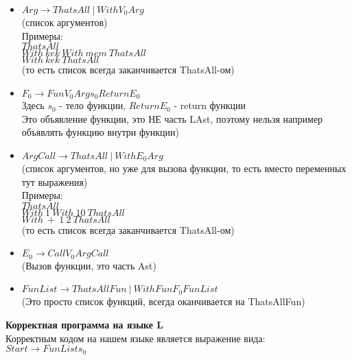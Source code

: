 \documentclass[12pt]{article}
\begin{document}
\begin{itemize}
	\item $Arg \to ThatsAll \ | \ With $\textvisiblespace$ V_0 $\textvisiblespace$ Arg$ \\ (список аргументов) \\
	Примеры: \\ 
	$ThatsAll$ \\
	$With \ kek \ With \ mem \ ThatsAll$ \\
	$With \ kek \ ThatsAll$ \\
	(то есть список всегда заканчивается ThatsAll-ом)
	
	\item $F_0 \to Fun $\textvisiblespace$  V_0 $\textvisiblespace$ Arg $\textvisiblespace$ s_0 $\textvisiblespace$ Return $\textvisiblespace$  E_0 $ \\
	Здесь $s_0$ - тело функции, $Return E_0$ - return функции \\
	Это объявление функции, это НЕ часть LAst, поэтому нельзя например объявлять функцию внутри функции) \\



	\item $ArgCall \to ThatsAll \ | \ With $\textvisiblespace$ E_0 $\textvisiblespace$ Arg$ \\ (список аргументов, но уже для вызова функции, то есть вместо переменных тут выражения) \\
	Примеры: \\ 
	$ThatsAll$ \\
	$With \ 1 \ With \ 10 \ ThatsAll$ \\
	$With \ + \ 1 \ 2 \ ThatsAll$ \\
	(то есть список всегда заканчивается ThatsAll-ом)
	
	\item $E_0 \to Call $\textvisiblespace$  V_0 $\textvisiblespace$ ArgCall$ \\
	(Вызов функции, это часть Ast) \\
	
	
	
	\item $FunList \to ThatsAllFun \ | \ WithFun $\textvisiblespace$ F_0 $\textvisiblespace$ FunList$ \\
	(Это просто список функций, всегда оканчивается на ThatsAllFun) \\
		
\end{itemize}

\textbf{Корректная программа на языке L} \\
Корректным кодом на нашем языке является выражение вида: \\
$Start \to FunList  $\textvisiblespace$ s_0$
\end{document}
